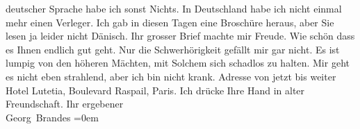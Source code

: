 \begin{ledgroupsized}[t]{13cm}
                    deutscher Sprache habe ich sonst Nichts. In Deutschland habe ich nicht einmal mehr einen Verleger. Ich gab in
                    diesen Tagen eine Broschüre
                    heraus, aber Sie lesen ja leider nicht Dänisch.\pend
           \pstart
           Ihr grosser Brief machte mir Freude. Wie schön dass es Ihnen endlich gut geht.
                    Nur die Schwerhörigkeit gefällt mir gar nicht. Es ist lumpig von den höheren
                    Mächten, mit Solchem sich schadlos zu halten.\pend
           \pstart
           Mir geht es nicht eben strahlend, aber ich bin nicht krank. Adresse von jetzt bis
                    weiter Hotel Lutetia, Boulevard Raspail, Paris.\pend
           \pstart
           Ich drücke Ihre Hand in alter Freundschaft.\pend
           \pstart
           Ihr ergebener{\\[\baselineskip]}\spacefill\mbox{Georg Brandes}\pend
           \leftskip=0em{}\endnumbering{}\end{ledgroupsized}  \newcommand{\dateiname}{L02016}\newcommand{\titel}{Georg Brandes an Arthur Schnitzler, 11. 4. 1911}\newcommand{\editorInnen}{Martin Anton Müller und Gerd-Hermann Susen}
      